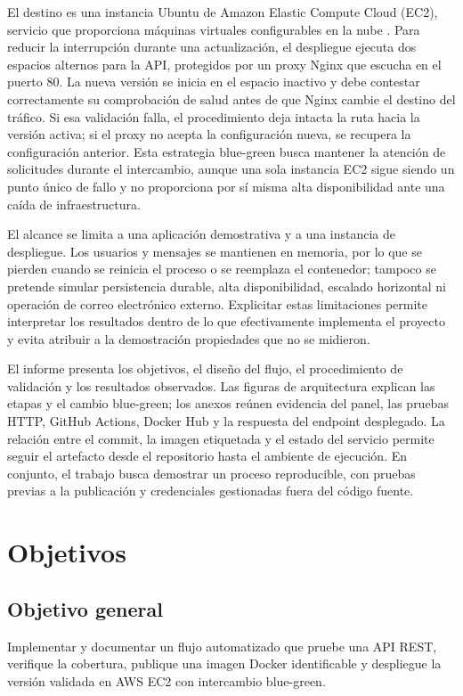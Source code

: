 \documentclass[12pt,letterpaper]{article}
\begin{document}
El destino es una instancia Ubuntu de Amazon Elastic Compute Cloud (EC2), servicio que proporciona máquinas virtuales configurables en la nube \cite{awsec2}. Para reducir la interrupción durante una actualización, el despliegue ejecuta dos espacios alternos para la API, protegidos por un proxy Nginx que escucha en el puerto 80. La nueva versión se inicia en el espacio inactivo y debe contestar correctamente su comprobación de salud antes de que Nginx cambie el destino del tráfico. Si esa validación falla, el procedimiento deja intacta la ruta hacia la versión activa; si el proxy no acepta la configuración nueva, se recupera la configuración anterior. Esta estrategia blue-green busca mantener la atención de solicitudes durante el intercambio, aunque una sola instancia EC2 sigue siendo un punto único de fallo y no proporciona por sí misma alta disponibilidad ante una caída de infraestructura.

El alcance se limita a una aplicación demostrativa y a una instancia de despliegue. Los usuarios y mensajes se mantienen en memoria, por lo que se pierden cuando se reinicia el proceso o se reemplaza el contenedor; tampoco se pretende simular persistencia durable, alta disponibilidad, escalado horizontal ni operación de correo electrónico externo. Explicitar estas limitaciones permite interpretar los resultados dentro de lo que efectivamente implementa el proyecto y evita atribuir a la demostración propiedades que no se midieron.

El informe presenta los objetivos, el diseño del flujo, el procedimiento de validación y los resultados observados. Las figuras de arquitectura explican las etapas y el cambio blue-green; los anexos reúnen evidencia del panel, las pruebas HTTP, GitHub Actions, Docker Hub y la respuesta del endpoint desplegado. La relación entre el commit, la imagen etiquetada y el estado del servicio permite seguir el artefacto desde el repositorio hasta el ambiente de ejecución. En conjunto, el trabajo busca demostrar un proceso reproducible, con pruebas previas a la publicación y credenciales gestionadas fuera del código fuente.
\newpage
\renewcommand{\contentsname}{Índice general}
\tableofcontents
\newpage

\section{Objetivos}
\subsection{Objetivo general}
Implementar y documentar un flujo automatizado que pruebe una API REST, verifique la cobertura, publique una imagen Docker identificable y despliegue la versión validada en AWS EC2 con intercambio blue-green.
\end{document}
